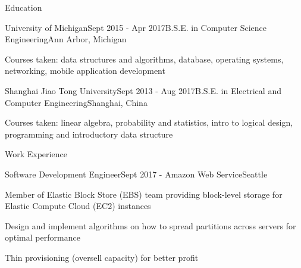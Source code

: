 \documentclass{resume} %
\begin{document}

\begin{rSection}{Education}
\begin{rSubsection}{University of Michigan}{Sept 2015 - Apr 2017}{B.S.E. in Computer Science Engineering}{Ann Arbor, Michigan}
	\item Courses taken: data structures and algorithms, database, operating systems, networking, mobile application development
\end{rSubsection}

\begin{rSubsection}{Shanghai Jiao Tong University}{Sept 2013 - Aug 2017}{B.S.E. in Electrical and Computer Engineering}{Shanghai, China}
	\item Courses taken: linear algebra, probability and statistics, intro to logical design, programming and introductory data structure
\end{rSubsection}



\end{rSection}

\begin{rSection}{Work Experience}
	\begin{rSubsection}{Software Development Engineer}{Sept 2017 - }{Amazon Web Service}{Seattle}
		\item Member of Elastic Block Store (EBS) team providing block-level storage for Elastic Compute Cloud (EC2) instances
		\item Design and implement algorithms on how to spread partitions across servers for optimal performance
		\item Thin provisioning (oversell capacity) for better profit
	\end{rSubsection}
\end{rSection}
\end{document}
